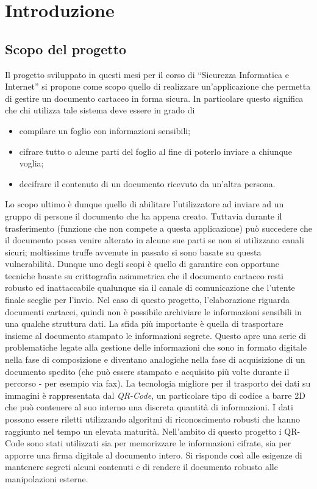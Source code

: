 \def \ti{\textit}
\def \bf{\textbf}

\chapter{Introduzione}
	\label{cap:intro}
	
\section{Scopo del progetto}
	\label{sec:scopo}

Il progetto sviluppato in questi mesi per il corso di ``Sicurezza Informatica e Internet'' si propone come scopo quello di realizzare un'applicazione che permetta di gestire un documento cartaceo in forma sicura.
In particolare questo significa che chi utilizza tale sistema deve essere in grado di
\begin{itemize}
	\item compilare un foglio con informazioni sensibili;
	\item cifrare tutto o alcune parti del foglio al fine di poterlo inviare a chiunque voglia;
	\item decifrare il contenuto di un documento ricevuto da un'altra persona.
\end{itemize}
Lo scopo ultimo è dunque quello di abilitare l'utilizzatore ad inviare ad un gruppo di persone il documento che ha appena creato. Tuttavia durante il trasferimento (funzione che non compete a questa applicazione) può succedere che il documento possa venire alterato in alcune sue parti se non si utilizzano canali sicuri; moltissime truffe avvenute in passato si sono basate su questa vulnerabilità. Dunque uno degli scopi è quello di garantire con opportune tecniche basate su crittografia asimmetrica che il documento cartaceo resti robusto ed inattaccabile qualunque sia il canale di comunicazione che l'utente finale sceglie per l'invio.
Nel caso di questo progetto, l'elaborazione riguarda documenti cartacei, quindi non è possibile archiviare le informazioni sensibili in una qualche struttura dati. La sfida più importante è quella di trasportare insieme al documento stampato le informazioni segrete.
Questo apre una serie di problematiche legate alla gestione delle informazioni che sono in formato digitale nella fase di composizione e diventano analogiche nella fase di acquisizione di un documento spedito (che può essere stampato e acquisito più volte durante il percorso - per esempio via fax).
La tecnologia migliore per il trasporto dei dati su immagini è rappresentata dal \emph{QR-Code}, un particolare tipo di codice a barre 2D che può contenere al suo interno una discreta quantità di informazioni.
I dati possono essere riletti utilizzando algoritmi di riconoscimento robusti che hanno raggiunto nel tempo un elevata maturità.
Nell'ambito di questo progetto i QR-Code sono stati utilizzati sia per memorizzare le informazioni cifrate, sia per apporre una firma digitale al documento intero. Si risponde così alle esigenze di mantenere segreti alcuni contenuti e di rendere il documento robusto alle manipolazioni esterne.

